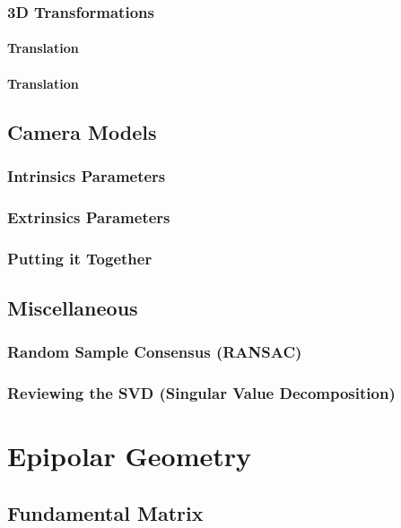 \documentclass{book}
\begin{document}
            \subsection{3D Transformations}
                \subsubsection{Translation}

                \subsubsection{Translation}

        \section{Camera Models}
            \subsection{Intrinsics Parameters}

            \subsection{Extrinsics Parameters}

            \subsection{Putting it Together}

        \section{Miscellaneous}
            \subsection{Random Sample Consensus (RANSAC)}
        
            \subsection{Reviewing the SVD (Singular Value Decomposition)}

    \chapter{Epipolar Geometry} 
        \section{Fundamental Matrix}
\end{document}

